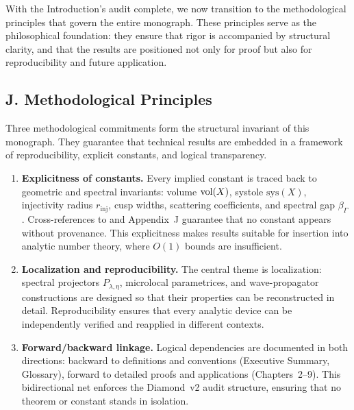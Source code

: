 With the Introduction’s audit complete,
we now transition to the methodological principles that govern the entire monograph.
These principles serve as the philosophical foundation:
they ensure that rigor is accompanied by structural clarity,
and that the results are positioned not only for proof but also for reproducibility and future application.


\subsection*{J. Methodological Principles}

Three methodological commitments form the structural invariant of this monograph.
They guarantee that technical results are embedded in a framework of reproducibility,
explicit constants, and logical transparency.

\begin{enumerate}[label=\arabic*.]
  \item \textbf{Explicitness of constants.}
  Every implied constant is traced back to geometric and spectral invariants:
  volume $\operatorname{vol}(X)$, systole $\mathrm{sys}(X)$, injectivity radius $r_{\mathrm{inj}}$,
  cusp widths, scattering coefficients, and spectral gap $\beta_\Gamma$.
  Cross-references to  and Appendix~J guarantee that
  no constant appears without provenance.
  This explicitness makes results suitable for insertion into analytic number theory,
  where $O(1)$ bounds are insufficient.

  \item \textbf{Localization and reproducibility.}
  The central theme is localization:
  spectral projectors $P_{\lambda,\eta}$, microlocal parametrices,
  and wave-propagator constructions are designed so that
  their properties can be reconstructed in detail.
  Reproducibility ensures that every analytic device
  can be independently verified and reapplied in different contexts.

  \item \textbf{Forward/backward linkage.}
  Logical dependencies are documented in both directions:
  backward to definitions and conventions (Executive Summary, Glossary),
  forward to detailed proofs and applications (Chapters~2–9).
  This bidirectional net enforces the Diamond~v2 audit structure,
  ensuring that no theorem or constant stands in isolation.
\end{enumerate}

